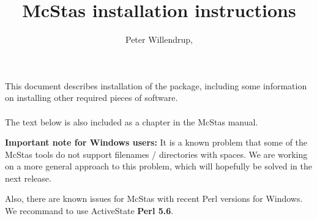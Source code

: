 \documentclass[a4paper,12pt]{article}
\title{McStas installation instructions}
\author{Peter
  Willendrup,\\\htmladdnormallink{peter.willendrup@risoe.dk}{mailto:peter.willendrup@risoe.dk}}
\begin{document}
\maketitle
\abstract \noindent This document describes installation of the
 package, including
some information on installing other required pieces of software.\\\
\\The text below is also included as a chapter in the McStas manual.


{\bf Important note for Windows users:} It is a known problem that some of
the McStas tools do not support filenames / directories with spaces.
We are working on a more general approach to this problem, which will
hopefully be solved in the next release.

Also, there are known issues for McStas with recent Perl versions for Windows. We recommand to use ActiveState {\bf Perl 5.6}.
\end{document}
